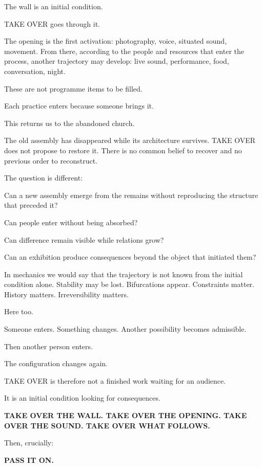 The wall is an initial condition.

TAKE OVER goes through it.

The opening is the first activation: photography, voice, situated sound,
movement. From there, according to the people and resources that enter
the process, another trajectory may develop: live sound, performance,
food, conversation, night.

These are not programme items to be filled.

Each practice enters because someone brings it.

This returns us to the abandoned church.

The old assembly has disappeared while its architecture survives. TAKE
OVER does not propose to restore it. There is no common belief to
recover and no previous order to reconstruct.

The question is different:

Can a new assembly emerge from the remains without reproducing the
structure that preceded it?

Can people enter without being absorbed?

Can difference remain visible while relations grow?

Can an exhibition produce consequences beyond the object that initiated
them?

In mechanics we would say that the trajectory is not known from the
initial condition alone. Stability may be lost. Bifurcations appear.
Constraints matter. History matters. Irreversibility matters.

Here too.

Someone enters. Something changes. Another possibility becomes
admissible.

Then another person enters.

The configuration changes again.

TAKE OVER is therefore not a finished work waiting for an audience.

It is an initial condition looking for consequences.

\textbf{TAKE OVER THE WALL. TAKE OVER THE OPENING. TAKE OVER THE SOUND.
TAKE OVER WHAT FOLLOWS.}

Then, crucially:

\textbf{PASS IT ON.}
